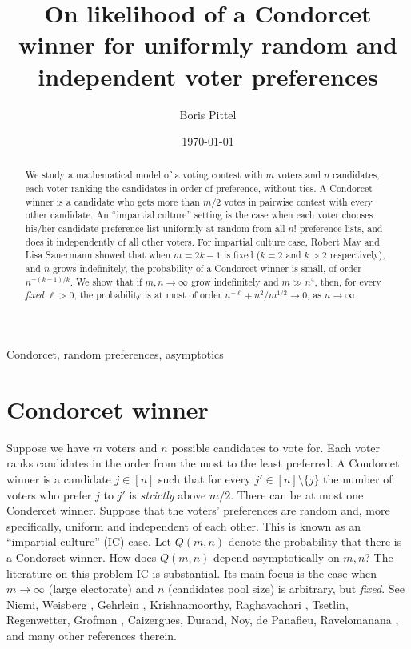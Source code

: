 \documentclass[11pt]{amsart}
\date{\today}
\theoremstyle{remark}
\numberwithin{equation}{section}
\begin{document}
\title[Condorcet winner]{On likelihood of a Condorcet winner for uniformly random and independent voter preferences}

\author{Boris Pittel}
\address{Department of Mathematics, The Ohio State University, $231$ West $18$-th Avenue, Columbus, Ohio $43210-1175$ (USA)}

\keywords
{Condorcet, random preferences, asymptotics}


\begin{abstract}
We study a mathematical model of a voting contest with $m$ voters and $n$ candidates, each voter ranking the candidates in order of preference, without ties. A Condorcet winner is a candidate who gets more than $m/2$ votes in
pairwise contest with every other candidate. An ``impartial culture'' setting is the case when each voter chooses his/her candidate preference list uniformly at random from all $n!$ preference lists, and does it independently of all other voters. 
For impartial culture case, Robert May and Lisa Sauermann showed that when $m=2k-1$ is fixed ($k=2$ and $k>2$ respectively), and $n$ grows indefinitely, the probability of a Condorcet winner is small, of order $n^{-(k-1)/k}$. 
We show that if $m, n\to\infty$ grow indefinitely and $m\gg n^4$, then, for every {\it fixed} $\ell>0$, the probability is at most of order 
$n^{-\ell} +n^2/m^{1/2}\to 0$, as $n\to\infty$.

\end{abstract}

\maketitle

\section{Condorcet winner} Suppose we have $m$ voters and $n$ possible candidates to vote for. Each voter ranks candidates in the order from the most to the least preferred. A Condorcet winner is a candidate $j\in [n]$ such that for every $j'\in [n]\setminus \{j\}$ the number of voters who prefer $j$ to $j'$ is {\it strictly\/} above $m/2$. There can be at most one Condercet winner. Suppose that the voters' preferences are random and, more specifically, uniform and independent of each other. 
This is known as an ``impartial culture'' (IC) case. Let $Q(m,n)$ denote the probability that there is a Condorset winner. How does $Q(m,n)$ 
depend asymptotically on $m,n$? The literature on this problem IC is substantial. Its main focus is the case when $m\to\infty$ (large electorate) and $n$ (candidates pool size) is arbitrary, but {\it fixed}.  See Niemi, Weisberg \cite{Nie}, Gehrlein \cite{Geh}, Krishnamoorthy,  Raghavachari \cite{KrR}, Tsetlin, Regenwetter, Grofman \cite{Tse}, Caizergues, Durand, Noy, de Panafieu, Ravelomanana \cite{Cai}, and many other references therein. 
\end{document}
